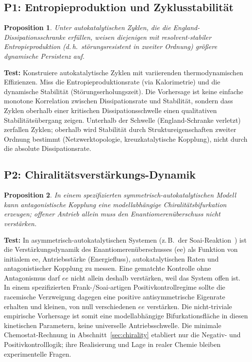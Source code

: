\documentclass[12pt,a4paper]{article}
\newtheorem{proposition}{Proposition}
\theoremstyle{remark}
\begin{document}
\subsection{P1: Entropieproduktion und Zyklusstabilität}

\begin{proposition}
Unter autokatalytischen Zyklen, die die England-Dissipationsschranke erfüllen, weisen diejenigen mit resolvent-stabiler Entropieproduktion (d.\,h.\ störungsresistent in zweiter Ordnung) größere dynamische Persistenz auf.
\end{proposition}

\textbf{Test:} Konstruiere autokatalytische Zyklen mit variierenden thermodynamischen Effizienzen. Miss die Entropieproduktionsrate (via Kalorimetrie) und die dynamische Stabilität (Störungserholungszeit). Die Vorhersage ist keine einfache monotone Korrelation zwischen Dissipationsrate und Stabilität, sondern dass Zyklen oberhalb einer kritischen Dissipationsschwelle einen qualitativen Stabilitätsübergang zeigen. Unterhalb der Schwelle (England-Schranke verletzt) zerfallen Zyklen; oberhalb wird Stabilität durch Struktureigenschaften zweiter Ordnung bestimmt (Netzwerktopologie, kreuzkatalytische Kopplung), nicht durch die absolute Dissipationsrate.

\subsection{P2: Chiralitätsverstärkungs-Dynamik}

\begin{proposition}
In einem spezifizierten symmetrisch-autokatalytischen Modell kann antagonistische Kopplung eine modellabhängige Chiralitätsbifurkation erzeugen; offener Antrieb allein muss den Enantiomerenüberschuss nicht verstärken.
\end{proposition}

\textbf{Test:} In asymmetrisch-autokatalytischen Systemen (z.\,B.\ der Soai-Reaktion~\citep{Soai1995}) ist die Verstärkungsdynamik des Enantiomerenüberschusses (ee) als Funktion von initialem ee, Antriebsstärke (Energiefluss), autokatalytischen Raten und antagonistischer Kopplung zu messen. Eine gematchte Kontrolle ohne Antagonismus darf $ee$ nicht allein deshalb verstärken, weil das System offen ist. In einem spezifizierten Frank-/Soai-artigen Positivkontrollregime sollte die racemische Verzweigung dagegen eine positive antisymmetrische Eigenrate erhalten und kleinen, von null verschiedenen $ee$ verstärken. Die nicht-triviale empirische Vorhersage ist somit eine modellabhängige Bifurkationsfläche in diesen kinetischen Parametern, keine universelle Antriebsschwelle. Die minimale Chemostat-Rechnung in Abschnitt~\ref{sec:chirality} etabliert nur die Negativ- und Positivkontrolllogik; ihre Realisierung und Lage in realer Chemie bleiben experimentelle Fragen.
\end{document}
